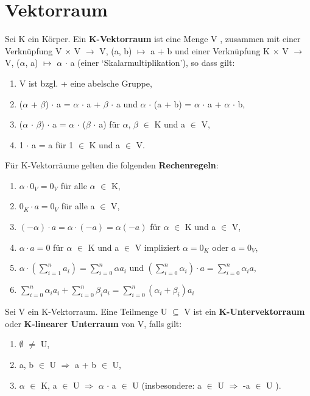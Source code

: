 \section{Vektorraum}
\begin{definition}
Sei K ein Körper. Ein \textbf{K-Vektorraum} ist eine Menge V , zusammen mit einer Verknüpfung V $\times$ V $\to$ V, (a, b) $\mapsto$ a + b und einer Verknüpfung K $\times$ V $\to$ V, ($\alpha$, a) $\mapsto$ $\alpha$ $\cdot$ a (einer ‘Skalarmultiplikation’), so dass gilt:
\begin{enumerate}
\item V ist bzgl. + eine abelsche Gruppe,
\item ($\alpha$ + $\beta$) $\cdot$ a = $\alpha$ $\cdot$ a + $\beta$ $\cdot$ a und $\alpha$ $\cdot$ (a + b) = $\alpha$ $\cdot$ a + $\alpha$ $\cdot$ b,
\item ($\alpha$ $\cdot$ $\beta$) $\cdot$ a = $\alpha$ $\cdot$ ($\beta$ $\cdot$ a) für $\alpha$, $\beta$ $\in$ K und a $\in$ V,
\item 1 $\cdot$ a = a für 1 $\in$ K und a $\in$ V.
\end{enumerate}
\end{definition}

\begin{remark}
Für K-Vektorräume gelten die folgenden \textbf{Rechenregeln}:
\begin{enumerate}
\item $\alpha \cdot 0_V = 0_V$ für alle $\alpha$ $\in$ K,
\item $0_K \cdot a = 0_V$  für alle a $\in$ V,
\item $(-\alpha) \cdot a = \alpha \cdot (-a) = \alpha(-a)$ für $\alpha$ $\in$ K und a $\in$ V,
\item $\alpha \cdot a = 0$ für $\alpha$ $\in$ K und a $\in$ V impliziert $\alpha = 0_K$ oder $a = 0_V$,
\item $\alpha \cdot (\sum\nolimits_{i=1}^{n} a_i) = \sum\nolimits_{i=0}^{n} \alpha a_i$ und $(\sum\nolimits_{i=0}^{n}\alpha_i) \cdot a = \sum\nolimits_{i=0}^{n} \alpha_i a$,
\item $\sum\nolimits_{i=0}^{n} \alpha_i a_i + \sum\nolimits_{i=0}^{n} \beta_i a_i = \sum\nolimits_{i=0}^{n} (\alpha_i + \beta_i) a_i$
\end{enumerate}
\end{remark}

\begin{definition}
Sei V ein K-Vektorraum. Eine Teilmenge U $\subseteq$ V ist ein \textbf{K-Untervektorraum} oder \textbf{K-linearer Unterraum} von V, falls gilt:
\begin{enumerate}
\item $\emptyset$ $\neq$ U,
\item a, b $\in$ U $\Rightarrow$ a + b $\in$ U,
\item $\alpha$ $\in$ K, a $\in$ U $\Rightarrow$ $\alpha$ $\cdot$ a $\in$ U (insbesondere: a $\in$ U $\Rightarrow$ -a $\in$ U ).
\end{enumerate}
\end{definition}

